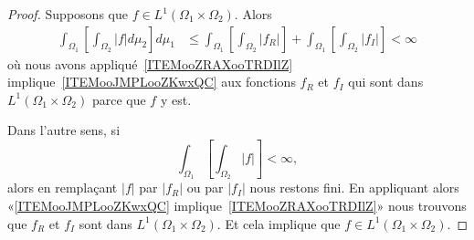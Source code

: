 \begin{proof}
    Supposons que \( f\in L^1(\Omega_1\times \Omega_2)\). Alors
    \begin{subequations}
        \begin{align}
            \int_{\Omega_1}\left[ \int_{\Omega_2}| f |d\mu_2 \right]d\mu_1&\leq \int_{\Omega_1}\left[ \int_{\Omega_2}| f_R | \right]+\int_{\Omega_1}\left[ \int_{\Omega_2}| f_I | \right]<\infty
        \end{align}
    \end{subequations}
    où nous avons appliqué~\ref{ITEMooZRAXooTRDIlZ} implique~\ref{ITEMooJMPLooZKwxQC} aux fonctions \( f_R\) et \( f_I\) qui sont dans \( L^1(\Omega_1\times \Omega_2)\) parce que \( f\) y est.

    Dans l'autre sens, si
    \begin{equation}
        \int_{\Omega_1}\left[ \int_{\Omega_2}| f | \right]<\infty,
    \end{equation}
    alors en remplaçant \( | f |\) par \( | f_R |\) ou par \( | f_I |\) nous restons fini. En appliquant alors «\ref{ITEMooJMPLooZKwxQC} implique~\ref{ITEMooZRAXooTRDIlZ}» nous trouvons que \( f_R\) et \( f_I\) sont dans \( L^1(\Omega_1\times \Omega_2)\). Et cela implique que \( f\in L^1(\Omega_1\times \Omega_2)\).
\end{proof}

